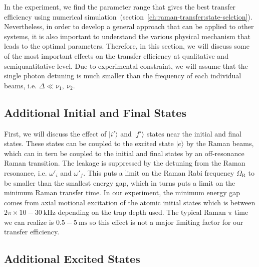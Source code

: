 In the experiment, we find the parameter range that gives the best transfer efficiency
using numerical simulation~(section~\ref{ch:raman-transfer:state-selction}).
Nevertheless, in order to develop a general approach that can be applied to other systems,
it is also important to understand the various physical mechanism that leads
to the optimal parameters.
Therefore, in this section, we will discuss some of the most important effects
on the transfer efficiency at qualitative and semiquantitative level.
Due to experimental constraint, we will assume that the single photon detuning is
much smaller than the frequency of each individual beams, i.e. $\Delta\ll\nu_1,\ \nu_2$.

\subsection{Additional Initial and Final States}
\label{ch:raman-transfer:raman:extra-init-final}

First, we will discuss the effect of $|i'\rangle$ and $|f'\rangle$ states
near the initial and final states.
These states can be coupled to the excited state $|e\rangle$ by the Raman beams,
which can in tern be coupled to the initial and final states
by an off-resonance Raman transition.
The leakage is suppressed by the detuning from the Raman resonance,
i.e. $\omega'_i$ and $\omega'_f$.
This puts a limit on the Raman Rabi frequency $\Omega_{\mathrm{R}}$ to be smaller
than the smallest energy gap, which in turns puts a limit on the minimum Raman transfer time.
In our experiment, the minimum energy gap comes from axial motional excitation of
the atomic initial states which is between $2\pi\times10 - 30~\mathrm{kHz}$
depending on the trap depth used.
The typical Raman $\pi$ time we can realize is $0.5 - 5~\mathrm{ms}$ so this effect
is not a major limiting factor for our transfer efficiency.

\subsection{Additional Excited States}
\label{ch:raman-transfer:raman:extra-ext}


